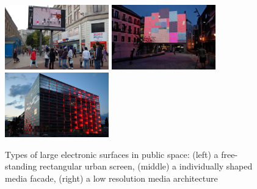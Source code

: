\begin{figure} [h!]
    \centering
        \includegraphics[width=4.5cm]{Illustrations/3.jpg}
        \includegraphics[width=4.5cm]{Illustrations/2.jpeg}
        \includegraphics[width=4.5cm]{Illustrations/1.jpg}
    \caption[Types of electronic surfaces]{Types of large electronic surfaces in public space: (left) a free-standing rectangular urban screen, (middle) a individually shaped media facade, (right) a low resolution media architecture}
    \label{InterfacingArchitecture}
\end{figure}




